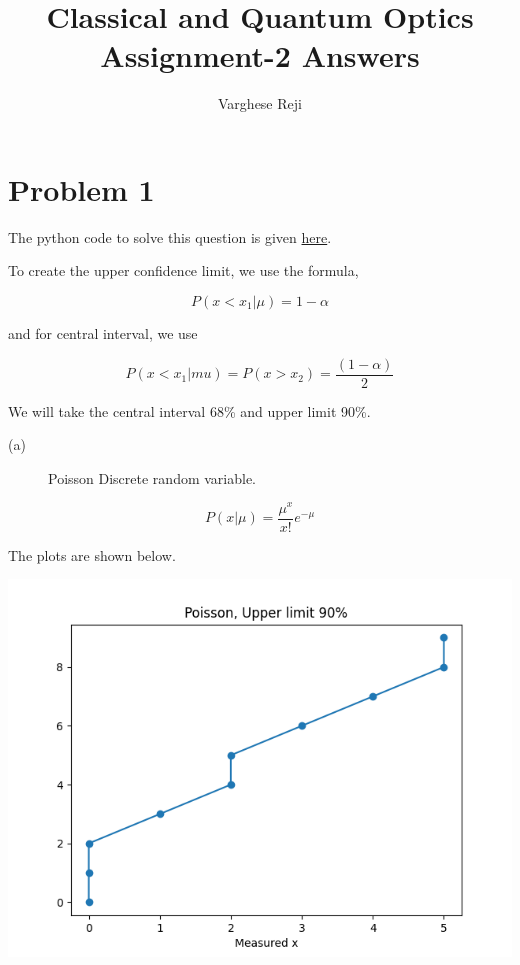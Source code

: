 \documentclass[a4paper,11pt]{article}
\author{Varghese Reji}
\date{}
\title{Classical and Quantum Optics\\\medskip
\large Assignment-2 Answers}
\begin{document}
\maketitle

\section*{Problem 1}
\label{sec:orgbf9f040}

The python code to solve this question is given \href{https://github.com/varghesereji/Coursework\_assignments/blob/main/APP/Ass2/Problem\_1.py}{here}.


To create the upper confidence limit, we use the formula,

\begin{equation}
\label{eq:orgff7b12b}
P(x<x_1|\mu)=1-\alpha
\end{equation}

and for central interval, we use

\begin{equation}
\label{eq:orgc580175}
P(x<x_1|mu)=P(x>x_2)=\frac{(1-\alpha)}{2}
\end{equation}

We will take the central interval 68\% and upper limit 90\%.

\begin{description}
\item[{(a)}] Poisson Discrete random variable.
\end{description}
  \begin{equation}
\label{eq:org3a2784b}
P(x|\mu) = \frac{\mu^x}{x!}e^{-\mu}
  \end{equation}

The plots are shown below.

\begin{center}
\includegraphics[width=.9\linewidth]{poisson_upper.png}
\end{center}
\end{document}

